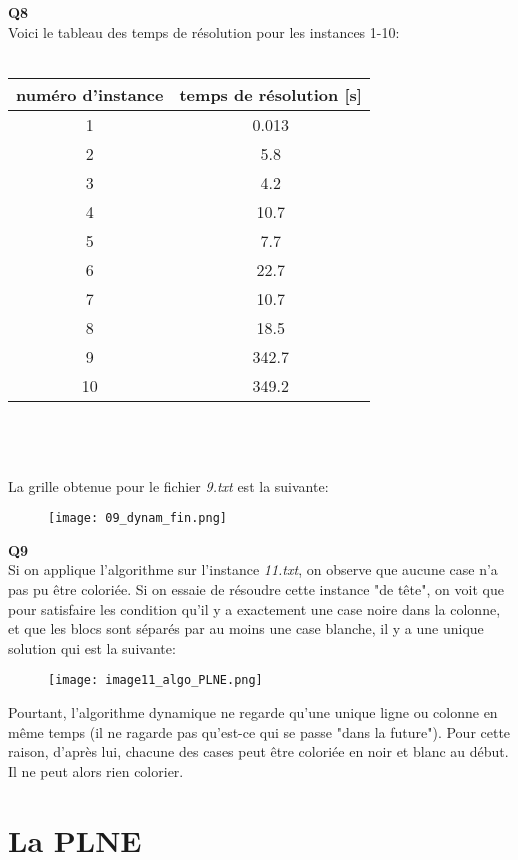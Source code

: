 \documentclass[10pt,a4paper]{article}
\begin{document}
\noindent 
\textbf{Q8}
\\
\noindent
Voici le tableau des temps de résolution pour les instances 1-10: \\ \\
\begin{tabular}{|c|c|}
\hline
numéro d'instance & temps de résolution [s]\\
\hline
\hline
1  & 0.013\\
\hline
2 & 5.8\\
\hline
3 & 4.2\\
\hline
4 & 10.7\\
\hline
5 & 7.7\\
\hline
6 & 22.7\\
\hline
7 & 10.7\\
\hline
8 & 18.5\\
\hline
9 & 342.7\\
\hline
10 & 349.2\\
\hline
\end{tabular} 
\\ \\ \\
\newpage
\noindent
La grille obtenue pour le fichier \textit{9.txt} est la suivante:

\begin{figure}[H]
\texttt{[image: 09\_dynam\_fin.png]}
\end{figure} 
\noindent
\textbf{Q9} \\
\noindent
Si on applique l'algorithme sur l'instance \textit{11.txt}, on observe que aucune case n'a pas pu être coloriée. Si on essaie de résoudre cette instance "de tête", on voit que pour satisfaire les condition qu'il y a exactement une case noire dans la colonne, et que les blocs sont séparés par au moins une case blanche, il y a une unique solution qui est la suivante: \\ 
\begin{figure}[H]
 \texttt{[image: image11\_algo\_PLNE.png]}
\end{figure}
\noindent
Pourtant, l'algorithme dynamique ne regarde qu'une unique ligne ou colonne en même temps (il ne ragarde pas qu'est-ce qui se passe "dans la future"). Pour cette raison, d'après lui, chacune des cases peut être coloriée en noir et blanc au début. Il ne peut alors rien colorier. 
\newpage
\section{La PLNE}
\end{document}
